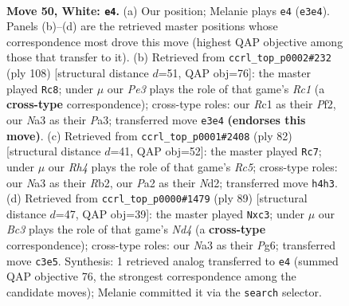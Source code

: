 \documentclass[11pt]{article}
\begin{document}
\clearpage

\begin{figure}[p]\centering
\begin{subfigure}{0.46\textwidth}\centering
\resizebox{\linewidth}{!}{%
\newchessgame
\chessboard[
  setfen={6r1/p7/1pr1p1kp/n4p2/2P4R/N1B1PP2/P3K1P1/2R5 w - - 7 50},
  showmover=false,
  pgfstyle=straightmove, color=movearrow, markmove={e3-e4}
]}
\caption{}
\end{subfigure}\hfill
\begin{subfigure}{0.46\textwidth}\centering
\resizebox{\linewidth}{!}{%
\newchessgame
\chessboard[
  setfen={8/p2rk3/1r4p1/3ppn1p/1P5P/PN3RP1/5P2/2R1K3 w - - 0 55},
  showmover=false,
  pgfstyle=straightmove, color=movearrow, markmove={c1-c8}
]}
\caption{}
\end{subfigure}
\\[4pt]
\begin{subfigure}{0.46\textwidth}\centering
\resizebox{\linewidth}{!}{%
\newchessgame
\chessboard[
  setfen={1r6/6p1/1r3pk1/2R1p2p/3n3P/1P4P1/1R1N1PK1/8 w - - 25 42},
  showmover=false,
  pgfstyle=straightmove, color=movearrow, markmove={c5-c7}
]}
\caption{}
\end{subfigure}\hfill
\begin{subfigure}{0.46\textwidth}\centering
\resizebox{\linewidth}{!}{%
\newchessgame
\chessboard[
  setfen={5k2/1p3p2/1p4p1/2pn4/P6P/1PN2RP1/3r1P2/5K2 b - - 1 45},
  showmover=false,
  pgfstyle=straightmove, color=movearrow, markmove={d5-c3}
]}
\caption{}
\end{subfigure}
\caption{\textbf{Move 50, White: \texttt{e4}.} (a) Our position; Melanie plays \texttt{e4} (\texttt{e3e4}). Panels (b)--(d) are the retrieved master positions whose correspondence most drove this move (highest QAP objective among those that transfer to it). (b) Retrieved from \texttt{ccrl\_top\_p0002\#232} (ply 108) [structural distance $d$=51, QAP obj=76]: the master played \texttt{Rc8}; under $\mu$ our \emph{Pe3} plays the role of that game's \emph{Rc1} (a \textbf{cross-type} correspondence); cross-type roles: our \emph{R}c1 as their \emph{P}f2, our \emph{N}a3 as their \emph{P}a3; transferred move \texttt{e3e4} \textbf{(endorses this move)}. (c) Retrieved from \texttt{ccrl\_top\_p0001\#2408} (ply 82) [structural distance $d$=41, QAP obj=52]: the master played \texttt{Rc7}; under $\mu$ our \emph{Rh4} plays the role of that game's \emph{Rc5}; cross-type roles: our \emph{N}a3 as their \emph{R}b2, our \emph{P}a2 as their \emph{N}d2; transferred move \texttt{h4h3}. (d) Retrieved from \texttt{ccrl\_top\_p0000\#1479} (ply 89) [structural distance $d$=47, QAP obj=39]: the master played \texttt{Nxc3}; under $\mu$ our \emph{Bc3} plays the role of that game's \emph{Nd4} (a \textbf{cross-type} correspondence); cross-type roles: our \emph{N}a3 as their \emph{P}g6; transferred move \texttt{c3e5}. Synthesis: 1 retrieved analog transferred to \texttt{e4} (summed QAP objective 76, the strongest correspondence among the candidate moves); Melanie committed it via the \texttt{search} selector.}
\label{fig:thought-m98}
\end{figure}
\end{document}
